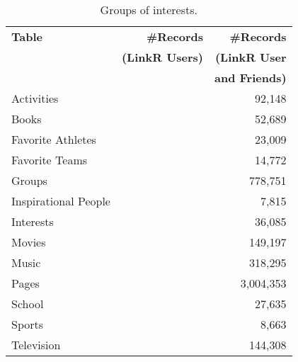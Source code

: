 \documentclass[letterpaper]{article}
\begin{document}
\begin{table}
\centering
\caption{\small Groups of interests.}
\label{tab:interests}
\begin{tabular}{|>{\small}p{2cm}|>{\small}r|>{\small}r|}
\hline
\textbf{Table} & \textbf{\#Records} & \textbf{\#Records} \\
& \textbf{(LinkR Users)} & \textbf{(LinkR User} \\
& & \textbf{and Friends)} \\
\hline
Activities &  & 92,148 \\
\hline
Books &  & 52,689 \\
\hline
Favorite Athletes &  & 23,009 \\
\hline
Favorite Teams &  & 14,772 \\
\hline
Groups &  & 778,751 \\
\hline
Inspirational People &  & 7,815 \\
\hline
Interests &  & 36,085 \\
\hline
Movies &  & 149,197 \\
\hline
Music &  & 318,295 \\
\hline
Pages &  & 3,004,353 \\
\hline
School &  & 27,635 \\
\hline
Sports &  & 8,663 \\
\hline
Television &  & 144,308 \\
\hline
\end{tabular}
\end{table}
\end{document}
